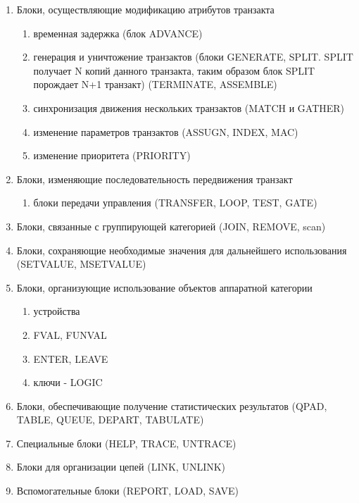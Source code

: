 \documentclass[14pt]{extarticle}
\begin{document}
\begin{enumerate}
	\item Блоки, осуществляющие модификацию атрибутов транзакта
	 \begin{enumerate}
		\item временная задержка (блок ADVANCE)
		\item генерация и уничтожение транзактов (блоки GENERATE, SPLIT. SPLIT получает N копий данного транзакта, таким образом блок SPLIT порождает N+1 транзакт) (TERMINATE, ASSEMBLE) 
		\item синхронизация движения нескольких транзактов (MATCH и GATHER)
		\item изменение параметров транзактов (ASSUGN, INDEX, MAC)
		\item изменение приоритета (PRIORITY)
	\end{enumerate}
	\item Блоки, изменяющие последовательность передвижения транзакт
	\begin{enumerate}
	\item блоки передачи управления (TRANSFER, LOOP, TEST, GATE)	
	\end{enumerate}
	\item Блоки, связанные с группирующей категорией (JOIN, REMOVE, scan)
	\item Блоки, сохраняющие необходимые значения для дальнейшего использования (SETVALUE, MSETVALUE)
	\item Блоки, организующие использование объектов аппаратной категории 
	\begin{enumerate}
	\item устройства
	\item FVAL, FUNVAL
	\item ENTER, LEAVE
	\item ключи - LOGIC
	\end{enumerate}
	\item Блоки, обеспечивающие получение статистических результатов (QPAD, TABLE, QUEUE, DEPART, TABULATE)
	\item Специальные блоки  (HELP, TRACE, UNTRACE)
	\item Блоки для организации цепей (LINK, UNLINK)
	\item Вспомогательные блоки (REPORT, LOAD, SAVE)
\end{enumerate}
\end{document}
